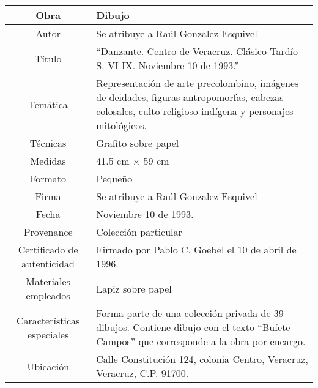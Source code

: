 \documentclass[10pt,letter]{report}
\begin{document}
\begin{table}[H]
\centering
\begin{tabular}{|c|m{}|}
\hline
Obra& Dibujo	\\
\hline
Autor & Se atribuye a Ra\'ul Gonzalez Esquivel\\
\hline
T\'itulo & ``Danzante. Centro de Veracruz. Cl\'asico Tard\'io S. VI-IX. Noviembre 10 de 1993.'' \\
\hline
Tem\'atica & Representaci\'on de arte precolombino, im\'agenes de deidades, figuras antropomorfas, cabezas colosales, culto religioso ind\'igena y personajes mitol\'ogicos.\\
\hline
T\'ecnicas &Grafito sobre papel \\
\hline
Medidas & 41.5 cm $\times$ 59 cm \\
\hline
 Formato & Peque\~no \\
 \hline
 Firma & Se atribuye a Ra\'ul Gonzalez Esquivel\\ 
 \hline
  Fecha & Noviembre 10 de 1993.\\
 \hline
 Provenance & Colecci\'on particular\\
 \hline
 Certificado de autenticidad& Firmado por Pablo C. Goebel el 10 de abril de 1996.  \\
 \hline 
  Materiales empleados & Lapiz sobre papel\\
 \hline
 Caracter\'isticas especiales & Forma parte de una colecci\'on privada de 39 dibujos. 
Contiene dibujo con el texto ``Bufete Campos'' que corresponde a la obra por encargo. \\
\hline 
Ubicaci\'on & Calle Constituci\'on 124, colonia Centro, Veracruz, Veracruz, C.P. 91700.\\
\hline

\end{tabular}
\end{table}
\end{document}
